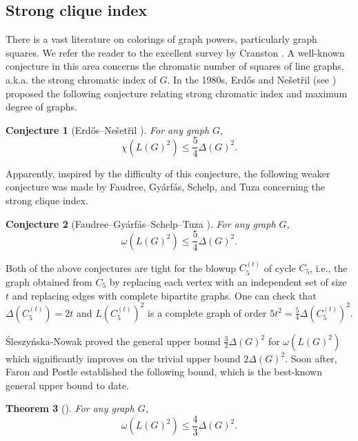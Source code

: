 \documentclass[11pt]{article}
\theoremstyle{plain}
\newtheorem{theorem}{Theorem}[section]
\newtheorem{conjecture}[theorem]{Conjecture}
\numberwithin{equation}{section}
\begin{document}
\subsection{Strong clique index}

There is a vast literature on colorings of graph powers, particularly graph squares. We refer the reader to the excellent survey by Cranston \cite{Cranston_2023}. A well-known conjecture in this area concerns the chromatic number of squares of line graphs, a.k.a. the strong chromatic index of $G$. In the 1980s, Erd\H{o}s and Ne\v{s}et\v{r}il (see \cite{Halasz_Sos_1989, Faudree_Gyarfas_Schelp_Tuza_1989}) proposed the following conjecture relating strong chromatic index and maximum degree of graphs.

\begin{conjecture}[Erd\H{o}s--Ne\v{s}et\v{r}il \cite{Halasz_Sos_1989, Faudree_Gyarfas_Schelp_Tuza_1989}]\label{conj:chi_line_square} For any graph $G$, 
\[ \chi(L(G)^2) \le \frac{5}{4}\Delta(G)^2.\]
\end{conjecture}

Apparently, inspired by the difficulty of this conjecture, the following weaker conjecture was made by Faudree, Gy\'{a}rf\'{a}s, Schelp, and Tuza \cite{Faudree_Gyarfas_Schelp_Tuza_1990} concerning the strong clique index. 

\begin{conjecture}[Faudree--Gy\'{a}rf\'{a}s--Schelp--Tuza \cite{Faudree_Gyarfas_Schelp_Tuza_1990}]\label{conj:omega_line_square}
    For any graph $G$, 
    \[\omega(L(G)^2) \le \frac{5}{4}\Delta(G)^2.\]
\end{conjecture}

Both of the above conjectures are tight for the blowup $C_5^{(t)}$ of cycle $C_5$, i.e., the graph obtained from $C_5$ by replacing each vertex with an independent set of size $t$ and replacing edges with complete bipartite graphs. One can check that $\Delta(C_5^{(t)}) = 2t$ and $L(C_5^{(t)})^2$ is a complete graph of order $5t^2 = \frac{5}{4}\Delta(C_5^{(t)})^2$.

\'{S}leszy\'{n}ska-Nowak \cite{Nowak_2016} proved the general upper bound $\frac{3}{2}\Delta(G)^2$ for $\omega(L(G)^2)$ which significantly improves on the trivial upper bound $2\Delta(G)^2$. Soon after, Faron and Postle \cite{Faron_Postle_2019} established the following bound, which is the best-known general upper bound to date.

\begin{theorem}[\cite{Faron_Postle_2019}]\label{thm:Faron_Postle_bound} For any graph $G$, 
\[\omega(L(G)^2) \le \frac{4}{3}\Delta(G)^2.\]      
\end{theorem}
\end{document}

